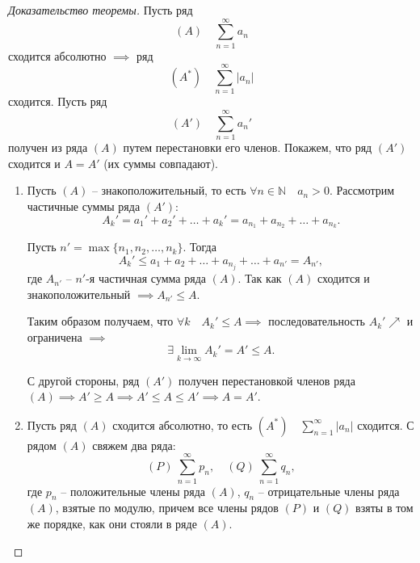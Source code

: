 \documentclass{report}
\theoremstyle{definition}
\begin{document}
\begin{proof}[Доказательство теоремы]
  Пусть ряд
  \begin{equation*}
    (A) \quad \sum_{n=1}^{\infty} a_n
  \end{equation*}
  сходится абсолютно $\implies$ ряд
  \begin{equation*}
    (A^*) \quad \sum_{n=1}^{\infty}|a_n|
  \end{equation*}
  сходится. Пусть ряд
  \begin{equation*}
    (A') \quad \sum_{n=1}^{\infty}a_n'
  \end{equation*}
  получен из ряда $(A)$ путем перестановки его членов. Покажем, что ряд $(A')$ сходится и $A = A'$ (их суммы совпадают).

  \begin{enumerate}
    \item Пусть $(A)$ -- знакоположительный, то есть $\forall n \in \mathbb{N} \quad a_n > 0$. Рассмотрим частичные суммы ряда $(A')$:
          \begin{equation*}
            A_k' = a_1' + a_2' + \ldots + a_k' = a_{n_1} + a_{n_2} + \ldots + a_{n_k}.
          \end{equation*}

          Пусть $n' = \max\{n_1,n_2,\ldots,n_k\}$. Тогда
          \begin{equation*}
            A_k' \leqslant a_1 + a_2 + \ldots + a_{n_j} + \ldots + a_{n'} = A_{n'},
          \end{equation*}
          где $A_{n'}$ -- $n'$-я частичная сумма ряда $(A)$. Так как $(A)$ сходится и знакоположительный $\implies A_{n'} \leqslant A$.

          Таким образом получаем, что $\forall k \quad A_k' \leqslant A \implies$ последовательность $A_k' \nearrow$ и ограничена $\implies$
          \begin{equation*}
            \exists\underset{k\rightarrow\infty}{\lim}A_k' = A' \leqslant A.
          \end{equation*}

          С другой стороны, ряд $(A')$ получен перестановкой членов ряда $(A) \implies A' \geqslant A \implies A' \leqslant A \leqslant A' \implies A = A'$.

    \item Пусть ряд $(A)$ сходится абсолютно, то есть $(A^*) \quad \sum_{n=1}^{\infty} |a_n|$ сходится. С рядом $(A)$ свяжем два ряда:
          \begin{equation*}
            (P) \ \sum_{n=1}^{\infty}p_n, \quad (Q) \ \sum_{n=1}^{\infty}q_n,
          \end{equation*}
          где $p_n$ -- положительные члены ряда $(A)$, $q_n$ -- отрицательные члены ряда $(A)$, взятые по модулю, причем все члены рядов $(P)$ и $(Q)$ взяты в том же порядке, как они стояли в ряде $(A)$.
  \end{enumerate}


\end{proof}
\end{document}
